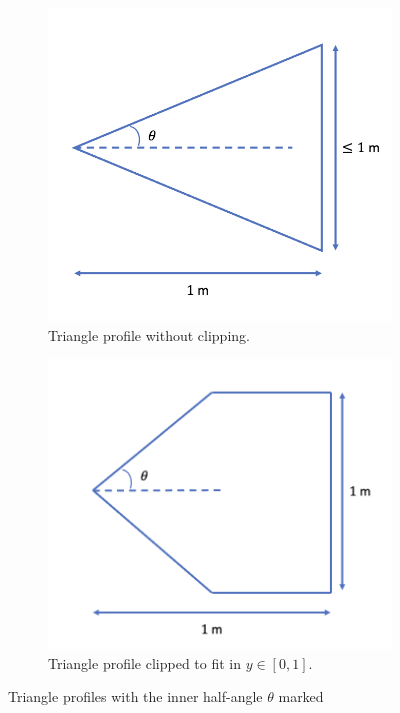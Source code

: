 \documentclass[11pt]{article}
\begin{document}
\begin{figure}[H]
\centering
\begin{subfigure}[b]{0.45\textwidth}
    \centering
    \includegraphics[width=\linewidth]{triangle_a.png}
    \caption{Triangle profile without clipping.}
    \label{fig:triangle-a}
\end{subfigure}
\hfill
\begin{subfigure}[b]{0.45\textwidth}
    \centering
    \includegraphics[width=\linewidth]{triangle_b.png}
    \caption{Triangle profile clipped to fit in $y \in [0,1]$.}
    \label{fig:triangle-b}
\end{subfigure}
\caption{Triangle profiles with the inner half-angle $\theta$ marked}
\label{fig:triangle}
\end{figure}
\end{document}
